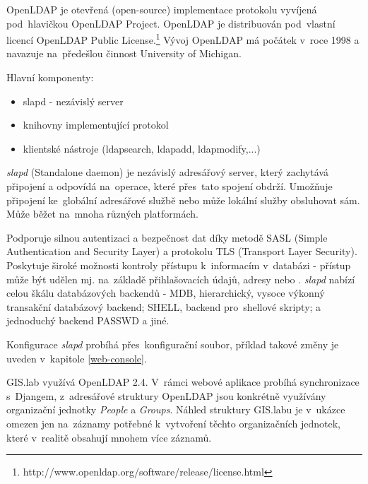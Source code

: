 OpenLDAP je otevřená (open-source) implementace protokolu 
vyvíjená \linebreak pod~hlavičkou OpenLDAP Project. OpenLDAP je distribuován pod~vlastní 
licencí OpenLDAP Public
License.\footnote{http://www.openldap.org/software/release/license.html}
Vývoj OpenLDAP má počátek v~roce 1998 a navazuje na~předešlou činnost
University of Michigan. \cite{openldap}

Hlavní komponenty:
\begin{itemize}
\item slapd - nezávislý  server
\item knihovny implementující  protokol
\item klientské nástroje (ldapsearch, ldapadd, ldapmodify,...)
\end{itemize}

\textit{slapd} (Standalone  daemon) je nezávislý 
adresářový server, který zachytává připojení a odpovídá na~operace, 
které přes~tato spojení obdrží. Umožňuje připojení ke~globální 
 adresářové službě nebo může lokální služby
obsluhovat sám. Může běžet na~mnoha různých platformách.

Podporuje silnou autentizaci a bezpečnost dat díky metodě SASL (Simple
Authentication and Security Layer) a protokolu TLS (Transport Layer
Security). Poskytuje široké možnosti kontroly přístupu k~informacím v~databázi - 
přístup může být udělen mj. na~základě přihlašovacích
údajů,  adresy nebo . \textit{slapd} nabízí celou škálu
databázových backendů - MDB, hierarchický, vysoce výkonný transakční
databázový backend; SHELL, backend pro~shellové skripty; a jednoduchý
backend PASSWD a jiné. \cite{openldap}

Konfigurace \textit{slapd} probíhá přes~konfigurační soubor, příklad takové změny je uveden v~kapitole \ref{web-console}. 


GIS.lab využívá OpenLDAP 2.4. V~rámci webové aplikace probíhá
synchronizace s~Djangem, z~adresářové struktury OpenLDAP jsou
konkrétně využívány organizační jednotky \textit{People} a
\textit{Groups}. Náhled struktury GIS.labu je v~ukázce omezen jen na~záznamy 
potřebné k~vytvoření  těchto organizačních jednotek,
které v~realitě obsahují mnohem více záznamů.

